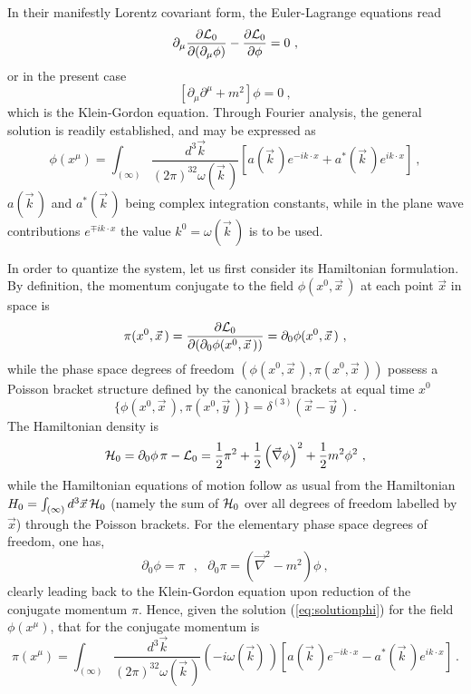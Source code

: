 \documentclass[a4paper,11pt]{article}
\begin{document}
In their manifestly Lorentz covariant form, the Euler-Lagrange equations read
\begin{equation}
\partial_\mu\frac{\partial{\cal L}_0}{\partial(\partial_\mu\phi)}-
\frac{\partial{\cal L}_0}{\partial\phi}=0\ ,
\end{equation}
or in the present case
\begin{equation}
\left[\partial_\mu\partial^\mu+m^2\right]\phi=0\ ,
\end{equation}
which is the Klein-Gordon equation. Through Fourier analysis, the general
solution is readily established, and may be expressed as
\begin{equation}
\phi(x^\mu)=\int_{(\infty)}\frac{d^3\vec{k}}{(2\pi)^32\omega(\vec{k}\,)}
\left[a(\vec{k}\,)e^{-ik\cdot x}+a^*(\vec{k}\,)e^{ik\cdot x}\right]\ ,
\label{eq:solutionphi}
\end{equation}
$a(\vec{k}\,)$ and $a^*(\vec{k}\,)$ being complex integration constants,
while in the plane wave contributions $e^{\mp ik\cdot x}$
the value $k^0=\omega(\vec{k}\,)$ is to be used.

In order to quantize the system, let us first consider its Hamiltonian
formulation. By definition, the momentum conjugate to the field
$\phi(x^0,\vec{x}\,)$ at each point $\vec{x}$ in space is
\begin{equation}
\pi(x^0,\vec{x}\,)=\frac{\partial{\cal L}_0}
{\partial(\partial_0\phi(x^0,\vec{x}\,))}=\partial_0\phi(x^0,\vec{x}\,)\ ,
\end{equation}
while the phase space degrees of freedom 
$(\phi(x^0,\vec{x}\,),\pi(x^0,\vec{x}\,))$ possess a Poisson bracket structure
defined by the canonical brackets at equal time $x^0$
\begin{equation}
\{\phi(x^0,\vec{x}\,),\pi(x^0,\vec{y}\,)\}=\delta^{(3)}(\vec{x}-\vec{y}\,)\ .
\end{equation}
The Hamiltonian density is
\begin{equation}
{\cal H}_0=\partial_0\phi\,\pi-{\cal L}_0=
\frac{1}{2}\pi^2+\frac{1}{2}\left(\vec{\nabla}\phi\right)^2+
\frac{1}{2}m^2\phi^2\ ,
\end{equation}
while the Hamiltonian equations of motion follow as usual from the
Hamiltonian $H_0=\int_{(\infty)}d^3\vec{x}\,{\cal H}_0$ (namely the sum
of ${\cal H}_0$ over all degrees of freedom labelled by $\vec{x}$)
through the Poisson brackets. For the elementary phase space degrees 
of freedom, one has,
\begin{equation}
\partial_0\phi=\pi\ \ \ ,\ \ \ 
\partial_0\pi=\left(\vec{\nabla}^2-m^2\right)\phi\ ,
\end{equation}
clearly leading back to the Klein-Gordon equation upon reduction of
the conjugate momentum $\pi$. Hence, given the solution (\ref{eq:solutionphi})
for the field $\phi(x^\mu)$, that for the conjugate momentum is
\begin{equation}
\pi(x^\mu)=\int_{(\infty)}\frac{d^3\vec{k}}{(2\pi)^32\omega(\vec{k}\,)}
\left(-i\omega(\vec{k})\,\right)
\left[a(\vec{k}\,)e^{-ik\cdot x}-a^*(\vec{k}\,)e^{ik\cdot x}\right]\ .
\label{eq:solutionpi}
\end{equation}
\end{document}
